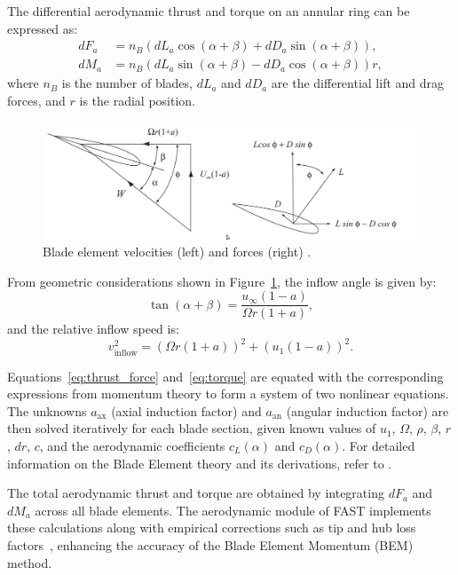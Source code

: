The differential aerodynamic thrust and torque on an annular ring can be expressed as:
\begin{align}
    dF_a &= n_B \left( dL_a \cos(\alpha + \beta) + dD_a \sin(\alpha + \beta) \right), \label{eq:thrust_force} \\
    dM_a &= n_B \left( dL_a \sin(\alpha + \beta) - dD_a \cos(\alpha + \beta) \right) r, \label{eq:torque}
\end{align}
where $n_B$ is the number of blades, $dL_a$ and $dD_a$ are the differential lift and drag forces, and $r$ is the radial position.
\begin{figure}[ht]
    \centering
    \includegraphics[width=\textwidth]{Figures/blade_element.png}
    \caption{Blade element velocities (left) and forces (right) \cite{burton2011}.}
    \label{fig:blade_geometry}
\end{figure}

From geometric considerations shown in Figure~\ref{fig:blade_geometry}, the inflow angle is given by:
\begin{equation}
    \tan(\alpha + \beta) = \frac{u_\infty(1 - a)}{\Omega r (1 + a)},
\end{equation}
and the relative inflow speed is:
\begin{equation}
    v_{\text{inflow}}^2 = \left( \Omega r (1 + a) \right)^2 + \left( u_1 (1 - a) \right)^2. \label{eq:inflow_speed}
\end{equation}

Equations~\eqref{eq:thrust_force} and~\eqref{eq:torque} are equated with the corresponding expressions from momentum theory to form a system of two nonlinear equations. The unknowns $a_{\text{ax}}$ (axial induction factor) and $a_{\text{an}}$ (angular induction factor) are then solved iteratively for each blade section, given known values of $u_1$, $\Omega$, $\rho$, $\beta$, $r$, $dr$, $c$, and the aerodynamic coefficients $c_L(\alpha)$ and $c_D(\alpha)$.
For detailed information on the Blade Element theory and its derivations, refer to \cite{ingram2011blade}.

The total aerodynamic thrust and torque are obtained by integrating $dF_a$ and $dM_a$ across all blade elements. The aerodynamic module of FAST implements these calculations along with empirical corrections such as tip and hub loss factors~\cite{fastV3}, enhancing the accuracy of the Blade Element Momentum (BEM) method.
         
